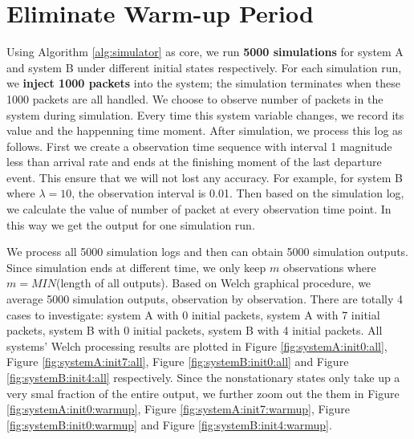 \documentclass[12pt]{article}  %
\theoremstyle{definition}
\theoremstyle{remark}
\begin{document}
\section{Eliminate Warm-up Period}
Using Algorithm \ref{alg:simulator} as core, we run \textbf{5000 simulations} for system A and system B under different initial states respectively.
For each simulation run, we \textbf{inject 1000 packets} into the system; the simulation terminates when these 1000 packets are all handled.
We choose to observe number of packets in the system during simulation.
Every time this system variable changes, we record its value and the happenning time moment.
After simulation, we process this log as follows.
First we create a observation time sequence with interval 1 magnitude less than arrival rate and ends at the finishing moment of the last departure event.
This ensure that we will not lost any accuracy.
For example, for system B where $\lambda=10$, the observation interval is 0.01.
Then based on the simulation log, we calculate the value of number of packet at every observation time point.
In this way we get the output for one simulation run.

We process all 5000 simulation logs and then can obtain 5000 simulation outputs.
Since simulation ends at different time, we only keep $m$ observations where $m = MIN$(length of all outputs).
Based on Welch graphical procedure, we average 5000 simulation outputs, observation by observation.
There are totally 4 cases to investigate: system A with 0 initial packets, system A with 7 initial packets, system B with 0 initial packets, system B with 4 initial packets.
All systems' Welch processing results are plotted in Figure \ref{fig:systemA:init0:all}, Figure \ref{fig:systemA:init7:all}, Figure \ref{fig:systemB:init0:all} and Figure \ref{fig:systemB:init4:all} respectively.
Since the nonstationary states only take up a very smal fraction of the entire output, we further zoom out the them in Figure \ref{fig:systemA:init0:warmup}, Figure \ref{fig:systemA:init7:warmup}, Figure \ref{fig:systemB:init0:warmup} and Figure \ref{fig:systemB:init4:warmup}.
\end{document}
